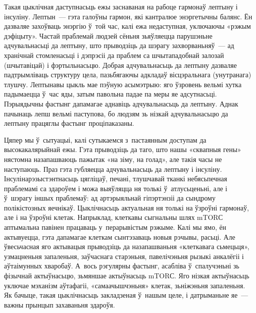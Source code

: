 Такая цыклічная даступнасьць ежы заснаваная на рабоце гармонаў лептыну і інсуліну. Лептын~--- гэта галоўны гармон, які кантралюе энэргетычны балянс. Ён дазваляе захоўваць энэргію ў~той час, калі ежа недаступная, уключаючы «рэжым дэфіцыту». Частай праблемай людзей сёньня зьяўляецца парушэньне адчувальнасьці да лептыну, што прыводзіць да шэрагу захворваньняў~--- ад хранічнай стомленасьці і дэпрэсіі да праблем са шчытападобнай залозай (шчытавіцай) і фэртыльнасьцю. Добрая адчувальнасьць да лептыну дазваляе падтрымліваць структуру цела, пазьбягаючы адкладаў вісцэральнага (унутранага) тлушчу. Лептынавы цыкль мае пэўную асымэтрыю: яго ўзровень вельмі хутка падымаецца ў~час яды, затым павольна падае па меры яе адсутнасьці. Пэрыядычны фастынг дапамагае аднавіць адчувальнасьць да лептыну. Аднак пачынаць лепш вельмі паступова, бо людзям зь нізкай адчувальнасьцю да лептыну працяглы фастынг проціпаказаны.


Цяпер мы ў~сытуацыі, калі сутыкаемся з~пастаянным доступам да высокакалярыйнай ежы. Гэта прыводзіць да таго, што нашы «сквапныя гены» нястомна назапашваюць пажытак «на зіму, на голад», але такія часы не наступаюць. Праз гэта губляецца адчувальнасьць да лептыну і інсуліну. Інсулінарэзыстэнтнасьць цягліцаў, печані, тлушчавай тканкі небясьпечная праблемамі са здароўем і можа выяўляцца ня толькі ў~атлусьценьні, але і ў~шэрагу іншых праблемаў: ад артэрыяльнай гіпэртэнзіі да сындрому полікістозных яечнікаў.
Цыклічнасьць актуальная ня толькі на ўзроўні гармонаў, але і на ўзроўні клетак. Напрыклад, клеткавы сыгнальны шлях mTORС аптымальна павінен працаваць у~перарывістым рэжыме. Калі мы ямо, ён актывуецца, гэта дапамагае клеткам сынтэзаваць новыя рэчывы, расьці. Але ўвесьчасная яго актывацыя прыводзіць да назапашваньня «клеткавага сьмецьця», узмацненьня запаленьня, заўчаснага старэньня, павелічэньня рызыкі анкалёгіі і аўтаімунных хваробаў. А~вось рэгулярны фастынг, асабліва ў~спалучэньні зь фізычнай актыўнасьцю, зьмяншае актыўнасьць mTORС. Яго нізкая актыўнасьць уключае мэханізм аўтафагіі, «самаачышчэньня» клетак, зьніжэньня запаленьня. Як бачыце, такая цыклічнасьць закладзеная ў~нашым целе, і датрыманьне яе~--- важны прынцып захаваньня здароўя.

